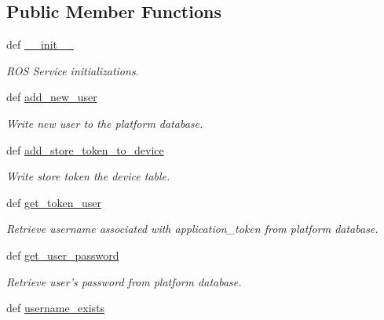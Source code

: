 \subsection*{Public Member Functions}
\begin{DoxyCompactItemize}
\item 
def \hyperlink{classrapp__application__authentication__manager_1_1database__handler_1_1DatabaseHandler_a4ba653248d13cce805d8e8e842364faa}{\-\_\-\-\_\-init\-\_\-\-\_\-}
\begin{DoxyCompactList}\small\item\em R\-O\-S Service initializations. \end{DoxyCompactList}\item 
def \hyperlink{classrapp__application__authentication__manager_1_1database__handler_1_1DatabaseHandler_a105686cfb2ba3285147db320e683db96}{add\-\_\-new\-\_\-user}
\begin{DoxyCompactList}\small\item\em Write new user to the platform database. \end{DoxyCompactList}\item 
def \hyperlink{classrapp__application__authentication__manager_1_1database__handler_1_1DatabaseHandler_a02c96e176e86700c498ac2879aaf9c73}{add\-\_\-store\-\_\-token\-\_\-to\-\_\-device}
\begin{DoxyCompactList}\small\item\em Write store token the device table. \end{DoxyCompactList}\item 
def \hyperlink{classrapp__application__authentication__manager_1_1database__handler_1_1DatabaseHandler_a30c5df0f241e485119cf4de3a55cf2b2}{get\-\_\-token\-\_\-user}
\begin{DoxyCompactList}\small\item\em Retrieve username associated with application\-\_\-token from platform database. \end{DoxyCompactList}\item 
def \hyperlink{classrapp__application__authentication__manager_1_1database__handler_1_1DatabaseHandler_ac6c7b7a9f4dc7e6527964e7eb42be1ab}{get\-\_\-user\-\_\-password}
\begin{DoxyCompactList}\small\item\em Retrieve user's password from platform database. \end{DoxyCompactList}\item 
def \hyperlink{classrapp__application__authentication__manager_1_1database__handler_1_1DatabaseHandler_aebac3ab30cb9d77af2066b76c6893e0d}{username\-\_\-exists}

\end{DoxyCompactItemize}
